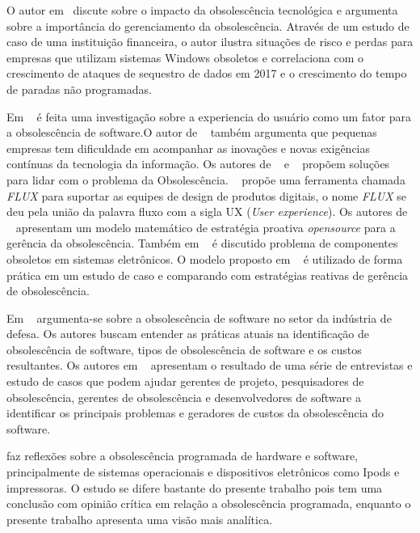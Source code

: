 O autor em~ discute sobre o impacto da obsolescência tecnológica e argumenta sobre a importância do gerenciamento da obsolescência. Através de um estudo de caso de uma instituição financeira, o autor ilustra situações de risco e perdas para empresas que utilizam sistemas Windows obsoletos e correlaciona com o crescimento de ataques de sequestro de dados em 2017 e o crescimento do tempo de paradas não programadas.

Em ~ é feita uma investigação sobre a experiencia do usuário como um fator para a obsolescência de software.O autor de ~ também argumenta que pequenas empresas tem dificuldade em acompanhar as inovações e novas exigências contínuas da tecnologia da informação. Os autores de ~ e  ~ propõem soluções para lidar com o problema da Obsolescência.  ~ propõe uma ferramenta chamada \textit{FLUX} para suportar as equipes de design de produtos digitais, o nome \textit{FLUX} se deu pela união da palavra fluxo com a sigla UX (\textit{User experience}). Os autores de  ~ apresentam um modelo matemático de estratégia proativa \textit{opensource} para a gerência da obsolescência.
Também em ~ é discutido problema de componentes obsoletos em sistemas eletrônicos. O modelo proposto em ~ é utilizado de forma prática em um estudo de caso e comparando com estratégias reativas de gerência de obsolescência.

Em ~ argumenta-se sobre a obsolescência de software no setor da indústria de defesa. Os autores buscam entender as práticas atuais na identificação de obsolescência de software, tipos de obsolescência de software e os custos resultantes. Os autores em ~ apresentam o resultado de uma série de entrevistas e estudo de casos que podem ajudar gerentes de projeto, pesquisadores de obsolescência, gerentes de obsolescência e desenvolvedores de software a identificar os principais problemas e geradores de custos da obsolescência do software. 

 faz reflexões sobre a obsolescência programada de hardware e software, principalmente de sistemas operacionais e dispositivos eletrônicos como Ipods e impressoras. O estudo  se difere bastante do presente trabalho pois tem uma conclusão com opinião crítica em relação a obsolescência programada, enquanto o presente trabalho apresenta uma visão mais analítica.

